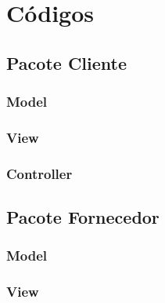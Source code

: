 \section{Códigos}


\subsection{Pacote Cliente}

\subsubsection{Model}



\subsubsection{View}



\subsubsection{Controller}



\subsection{Pacote Fornecedor}

\subsubsection{Model}



\subsubsection{View}



